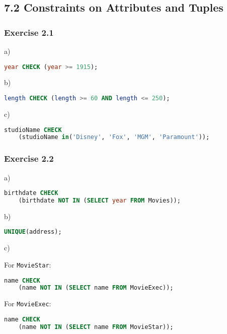 \documentclass[../../main.tex]{subfiles}
\begin{document}
\subsection*{7.2 Constraints on Attributes and Tuples}

\subsubsection*{Exercise 2.1}

a)

\begin{lstlisting}[language=sql]
  year CHECK (year >= 1915);
\end{lstlisting}

b)

\begin{lstlisting}[language=sql]
  length CHECK (length >= 60 AND length <= 250);
\end{lstlisting}

c)

\begin{lstlisting}[language=sql]
  studioName CHECK 
    (studioName in('Disney', 'Fox', 'MGM', 'Paramount'));
\end{lstlisting}

\subsubsection*{Exercise 2.2}

a)

\begin{lstlisting}[language=sql]
  birthdate CHECK 
    (birthdate NOT IN (SELECT year FROM Movies));
\end{lstlisting}

b)

\begin{lstlisting}[language=sql]
  UNIQUE(address);
\end{lstlisting}

c)

For \verb|MovieStar|:

\begin{lstlisting}[language=sql]
  name CHECK
    (name NOT IN (SELECT name FROM MovieExec));
\end{lstlisting}

For \verb|MovieExec|:

\begin{lstlisting}[language=sql]
  name CHECK
    (name NOT IN (SELECT name FROM MovieStar));
\end{lstlisting}
\end{document}
